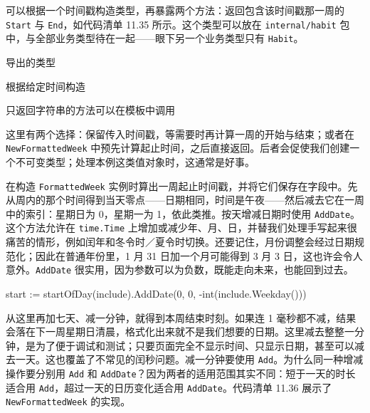 可以根据一个时间戳构造类型，再暴露两个方法：返回包含该时间戳那一周的 \texttt{Start} 与 \texttt{End}，如代码清单 11.35 所示。这个类型可以放在 \texttt{internal/habit} 包中，与全部业务类型待在一起——眼下另一个业务类型只有 \texttt{Habit}。


\begin{codeannotations}
\item 导出的类型
\item 根据给定时间构造
\item 只返回字符串的方法可以在模板中调用
\end{codeannotations}

这里有两个选择：保留传入时间戳，等需要时再计算一周的开始与结束；或者在 \texttt{NewFormattedWeek} 中预先计算起止时间，之后直接返回。后者会促使我们创建一个不可变类型；处理本例这类值对象时，这通常是好事。

在构造 \texttt{FormattedWeek} 实例时算出一周起止时间戳，并将它们保存在字段中。先从周内的那个时间得到当天零点——日期相同，时间是午夜——然后减去它在一周中的索引：星期日为 0，星期一为 1，依此类推。按天增减日期时使用 \texttt{AddDate}。这个方法允许在 \texttt{time.Time} 上增加或减少年、月、日，并替我们处理手写起来很痛苦的情形，例如闰年和冬令时／夏令时切换。还要记住，月份调整会经过日期规范化；因此在普通年份里，1 月 31 日加一个月可能得到 3 月 3 日，这也许会令人意外。\texttt{AddDate} 很实用，因为参数可以为负数，既能走向未来，也能回到过去。

\begin{gocode}[]
start := startOfDay(include).AddDate(0, 0, -int(include.Weekday()))
\end{gocode}

从这里再加七天、减一分钟，就得到本周结束时刻。如果连 1 毫秒都不减，结果会落在下一周星期日清晨，格式化出来就不是我们想要的日期。这里减去整整一分钟，是为了便于调试和测试；只要页面完全不显示时间、只显示日期，甚至可以减去一天。这也覆盖了不常见的闰秒问题。减一分钟要使用 \texttt{Add}。为什么同一种增减操作要分别用 \texttt{Add} 和 \texttt{AddDate}？因为两者的适用范围其实不同：短于一天的时长适合用 \texttt{Add}，超过一天的日历变化适合用 \texttt{AddDate}。代码清单 11.36 展示了 \texttt{NewFormattedWeek} 的实现。

